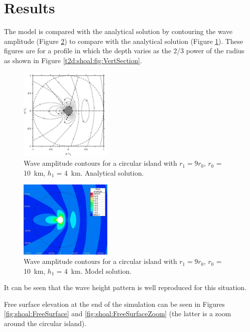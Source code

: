 \section{Results}
The model is compared with the analytical solution by contouring the wave
amplitude (Figure \ref{t2d:shoal:fig:ModelSol}) to compare with the analytical
solution (Figure \ref{t2d:shoal:fig:AnalSol}).
These figures are for a profile in which the depth varies as the 2/3 power of
the radius as shown in Figure \ref{t2d:shoal:fig:VertSection}.

\begin{figure}[!htbp]
 \centering
 \includegraphics[width=0.4\textwidth]{img/AnalyticSolutionShoal.png}
 \caption{Wave amplitude contours for a circular island with $r_1 = 9r_0$, $r_0$ = 10~km, $h_1$ = 4~km. Analytical solution.}
 \label{t2d:shoal:fig:AnalSol}
\end{figure}

\begin{figure}[!htbp]
 \centering
 \includegraphics[width=0.4\textwidth]{img/ModelSolutionShoal.png}
 \caption{Wave amplitude contours for a circular island with $r_1 = 9r_0$, $r_0$ = 10~km, $h_1$ = 4~km. Model solution.}
 \label{t2d:shoal:fig:ModelSol}
\end{figure}

It can be seen that the wave height pattern is well reproduced for this situation.

Free surface elevation at the end of the simulation can be seen in Figures
\ref{fig:shoal:FreeSurface} and \ref{fig:shoal:FreeSurfaceZoom} (the latter is a
zoom around the circular island).


